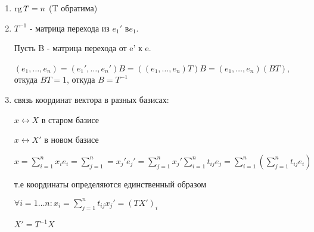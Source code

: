 \begin{enumerate}
    \item \(\operatorname{rg} T = n\) (T обратима)


    \item \(T^{-1}\) - матрица перехода из \(e_1'\) в\(e_1\).

          Пусть B - матрица перехода от e' к e.

          \((e_1,\ldots,e_n) = (e_1',\ldots,e_n')B = ((e_1,\ldots,e_n)T)B = (e_1,\ldots,e_n) (BT)\), откуда \(BT = 1\),  откуда  \(B = T^{-1}\)


    \item связь координат вектора в разных базисах:

          \(x \leftrightarrow X\) в старом базисе

          \(x \leftrightarrow X'\) в новом базисе

          \(x = \sum\limits_{i=1}^n x_i e_i  = \sum \limits_{j=1}^n = x_j'e_j' = \sum\limits_{j=1}^n x_j' \sum\limits_{i=1}^n t_{ij} e_j = \sum\limits_{i=1}^n (\sum\limits_{j=1}^n t_{ij} e_i)\)

          т.е координаты определяются единственный образом

          \(\forall i = 1\ldots n: x_i =\sum\limits_{j=1}^n t_{ij} x_j' = (TX')_i\)

          \(X' = T^{-1} X\)
\end{enumerate}

